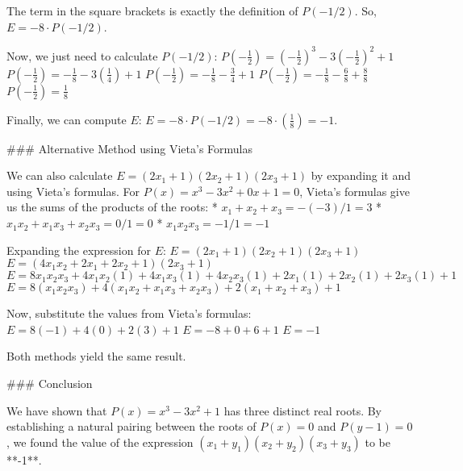     The term in the square brackets is exactly the definition of $P(-1/2)$.
    So, $E = -8 \cdot P(-1/2)$.

    Now, we just need to calculate $P(-1/2)$:
    $P\left(-\frac{1}{2}\right) = \left(-\frac{1}{2}\right)^3 - 3\left(-\frac{1}{2}\right)^2 + 1$
    $P\left(-\frac{1}{2}\right) = -\frac{1}{8} - 3\left(\frac{1}{4}\right) + 1$
    $P\left(-\frac{1}{2}\right) = -\frac{1}{8} - \frac{3}{4} + 1$
    $P\left(-\frac{1}{2}\right) = -\frac{1}{8} - \frac{6}{8} + \frac{8}{8}$
    $P\left(-\frac{1}{2}\right) = \frac{1}{8}$

    Finally, we can compute $E$:
    $E = -8 \cdot P(-1/2) = -8 \cdot \left(\frac{1}{8}\right) = -1$.

### Alternative Method using Vieta's Formulas

We can also calculate $E = (2x_1 + 1)(2x_2 + 1)(2x_3 + 1)$ by expanding it and using Vieta's formulas.
For $P(x) = x^3 - 3x^2 + 0x + 1 = 0$, Vieta's formulas give us the sums of the products of the roots:
*   $x_1 + x_2 + x_3 = -(-3)/1 = 3$
*   $x_1x_2 + x_1x_3 + x_2x_3 = 0/1 = 0$
*   $x_1x_2x_3 = -1/1 = -1$

Expanding the expression for $E$:
$E = (2x_1+1)(2x_2+1)(2x_3+1)$
$E = (4x_1x_2 + 2x_1 + 2x_2 + 1)(2x_3 + 1)$
$E = 8x_1x_2x_3 + 4x_1x_2(1) + 4x_1x_3(1) + 4x_2x_3(1) + 2x_1(1) + 2x_2(1) + 2x_3(1) + 1$
$E = 8(x_1x_2x_3) + 4(x_1x_2 + x_1x_3 + x_2x_3) + 2(x_1 + x_2 + x_3) + 1$

Now, substitute the values from Vieta's formulas:
$E = 8(-1) + 4(0) + 2(3) + 1$
$E = -8 + 0 + 6 + 1$
$E = -1$

Both methods yield the same result.

### Conclusion

We have shown that $P(x)=x^3-3x^2+1$ has three distinct real roots. By establishing a natural pairing between the roots of $P(x)=0$ and $P(y-1)=0$, we found the value of the expression $(x_1 + y_1)(x_2 + y_2)(x_3 + y_3)$ to be **-1**.